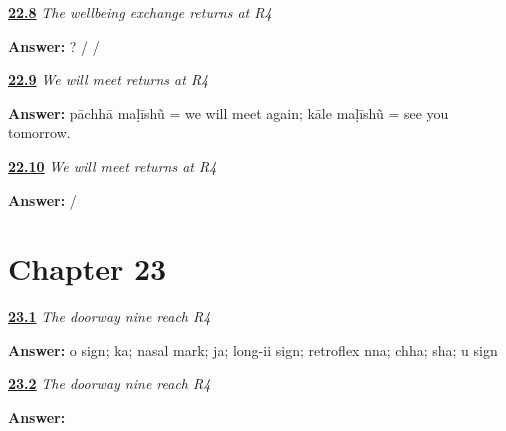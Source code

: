 \noindent\begin{minipage}[t]{\linewidth}
\raggedright
\hyperlink{review-GU-R18-wellbeing-r4-writing}{\textbf{22.8}} \emph{The wellbeing exchange returns at R4}\par
\small \textbf{Answer:}   ? /    /  \par
\end{minipage}\par\medskip

\noindent\begin{minipage}[t]{\linewidth}
\raggedright
\hyperlink{review-GU-R18-farewell-r4-listening}{\textbf{22.9}} \emph{We will meet returns at R4}\par
\small \textbf{Answer:} pāchhā maḷīshũ = we will meet again; kāle maḷīshũ = see you tomorrow.\par
\end{minipage}\par\medskip

\noindent\begin{minipage}[t]{\linewidth}
\raggedright
\hyperlink{review-GU-R18-farewell-r4-writing}{\textbf{22.10}} \emph{We will meet returns at R4}\par
\small \textbf{Answer:}   /  \par
\end{minipage}\par\medskip

\section*{Chapter 23}

\noindent\begin{minipage}[t]{\linewidth}
\raggedright
\hyperlink{review-GU-R19-doorway-nine-r4-reading}{\textbf{23.1}} \emph{The doorway nine reach R4}\par
\small \textbf{Answer:} o sign; ka; nasal mark; ja; long-ii sign; retroflex nna; chha; sha; u sign\par
\end{minipage}\par\medskip

\noindent\begin{minipage}[t]{\linewidth}
\raggedright
\hyperlink{review-GU-R19-doorway-nine-r4-dictation}{\textbf{23.2}} \emph{The doorway nine reach R4}\par
\small \textbf{Answer:}         \par
\end{minipage}\par\medskip

